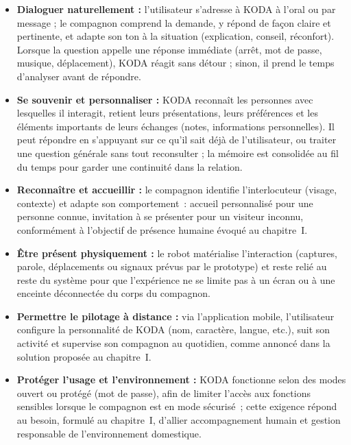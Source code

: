 \documentclass[a4paper,12pt]{report}
\begin{document}
	\begin{itemize}
		\item \textbf{Dialoguer naturellement :} l'utilisateur s'adresse à KODA à l'oral ou
		par message ; le compagnon comprend la demande, y répond de façon claire et
		pertinente, et adapte son ton à la situation (explication, conseil, réconfort).
		Lorsque la question appelle une réponse immédiate (arrêt, mot de passe, musique,
		déplacement), KODA réagit sans détour ; sinon, il prend le temps d'analyser avant
		de répondre.
		\item \textbf{Se souvenir et personnaliser :} KODA reconnaît les personnes avec
		lesquelles il interagit, retient leurs présentations, leurs préférences et les
		éléments importants de leurs échanges (notes, informations personnelles). Il peut
		répondre en s'appuyant sur ce qu'il sait déjà de l'utilisateur, ou traiter une
		question générale sans tout reconsulter ; la mémoire est consolidée au fil du
		temps pour garder une continuité dans la relation.
		\item \textbf{Reconnaître et accueillir :} le compagnon identifie l'interlocuteur
		(visage, contexte) et adapte son comportement~: accueil personnalisé pour une
		personne connue, invitation à se présenter pour un visiteur inconnu, conformément
		à l'objectif de présence humaine évoqué au chapitre~I.
		\item \textbf{Être présent physiquement :} le robot matérialise l'interaction
		(captures, parole, déplacements ou signaux prévus par le prototype) et reste
		relié au reste du système pour que l'expérience ne se limite pas à un écran ou à
		une enceinte déconnectée du corps du compagnon.
		\item \textbf{Permettre le pilotage à distance :} via l'application mobile,
		l'utilisateur configure la personnalité de KODA (nom, caractère, langue, etc.),
		suit son activité et supervise son compagnon au quotidien, comme annoncé dans la
		solution proposée au chapitre~I.
		\item \textbf{Protéger l'usage et l'environnement :} KODA fonctionne selon des
		modes ouvert ou protégé (mot de passe), afin de limiter l'accès aux fonctions
		sensibles lorsque le compagnon est en mode sécurisé~; cette exigence répond au
		besoin, formulé au chapitre~I, d'allier accompagnement humain et gestion
		responsable de l'environnement domestique.
	\end{itemize}
	
\end{document}
